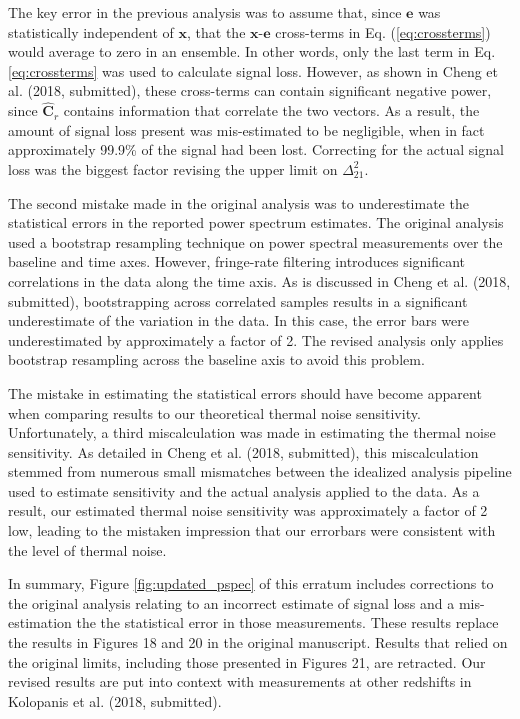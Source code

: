 \documentclass[onecolumn]{emulateapj} \shorttitle{}
\newcommand{\kolopaniscitet}{Kolopanis et al. (2018, submitted)}
\newcommand{\chengcitet}{Cheng et al. (2018, submitted)}
\begin{document}
The key error in the previous analysis was to assume that, since $\mathbf e$ was statistically independent of $\mathbf x$, that
the $\mathbf x$-$\mathbf e$ cross-terms in Eq. (\ref{eq:crossterms}) would
average to zero in an ensemble. In other words, only the last term in
Eq. \ref{eq:crossterms} was used to calculate signal loss. However, as shown in \chengcitet, these cross-terms can contain
significant negative power, since $\widehat{\textbf{C}}_r$ contains information
that correlate the
two vectors.  As a result, the amount of signal loss present was mis-estimated to be negligible, when in fact approximately
99.9\% of the signal had been lost. Correcting for the actual signal loss was the biggest factor revising the upper limit
on $\Delta^2_{21}$.

The second mistake made in the original analysis was to underestimate the statistical errors in the reported power spectrum
estimates.  The original analysis used a bootstrap resampling technique on power spectral measurements over the baseline and time axes.
However, fringe-rate filtering introduces significant correlations in the data
along the time axis.  As is discussed in \chengcitet, bootstrapping across correlated samples results in a significant underestimate
of the variation in the data.  In this case, the error bars were underestimated by approximately a factor of 2.
The revised analysis only applies bootstrap resampling across the baseline axis to avoid this problem.

The mistake in estimating the statistical errors should have become apparent when comparing results to our theoretical
thermal noise sensitivity.  Unfortunately, a third miscalculation was made in estimating the thermal noise sensitivity.
As detailed in \chengcitet, this miscalculation stemmed from numerous small mismatches between the idealized analysis
pipeline used to estimate sensitivity and the actual analysis applied to the data.  As a result, our estimated thermal
noise sensitivity was approximately a factor of 2 low, leading to the mistaken impression that our
errorbars were consistent with the level of thermal noise.

In summary, Figure \ref{fig:updated_pspec} of this erratum includes corrections to the original analysis relating to
an incorrect estimate of signal loss and a mis-estimation the the statistical error in those measurements.
These results replace the results in Figures 18 and 20 in the original manuscript.  Results that relied on
the original limits, including those presented in Figures 21, are retracted.
Our revised results are put into context with measurements at other redshifts in \kolopaniscitet.  
\end{document}
